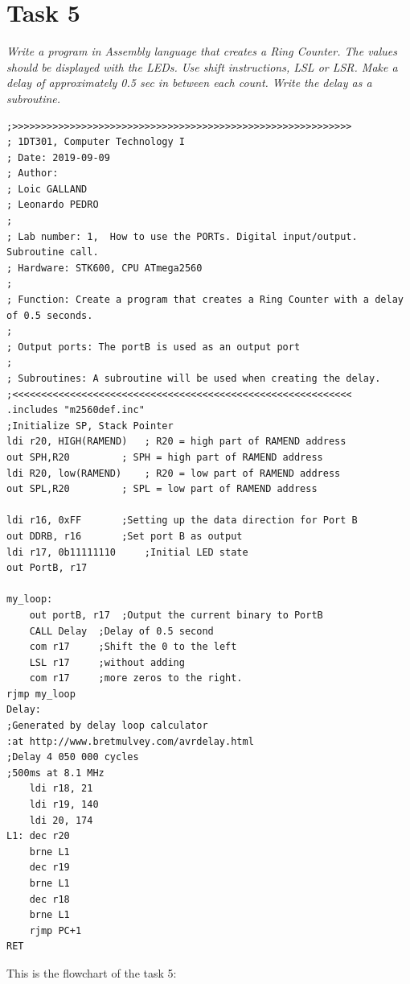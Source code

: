 \documentclass[a4paper,12pt]{article}
\begin{document}
\section{Task 5}
\textit{Write a program in Assembly language that creates a Ring Counter. The values should be
displayed with the LEDs. Use shift instructions, LSL or LSR.
Make a delay of approximately 0.5 sec in between each count. Write the delay as a
subroutine.}
\lstset{style=Asm}
\begin{lstlisting}
;>>>>>>>>>>>>>>>>>>>>>>>>>>>>>>>>>>>>>>>>>>>>>>>>>>>>>>>>>>>
; 1DT301, Computer Technology I
; Date: 2019-09-09
; Author:
; Loic GALLAND
; Leonardo PEDRO
;
; Lab number: 1,  How to use the PORTs. Digital input/output. Subroutine call.
; Hardware: STK600, CPU ATmega2560
;
; Function: Create a program that creates a Ring Counter with a delay of 0.5 seconds. 
;
; Output ports: The portB is used as an output port
;
; Subroutines: A subroutine will be used when creating the delay. 
;<<<<<<<<<<<<<<<<<<<<<<<<<<<<<<<<<<<<<<<<<<<<<<<<<<<<<<<<<<<
.includes "m2560def.inc"
;Initialize SP, Stack Pointer
ldi r20, HIGH(RAMEND)	; R20 = high part of RAMEND address
out SPH,R20 		; SPH = high part of RAMEND address
ldi R20, low(RAMEND) 	; R20 = low part of RAMEND address
out SPL,R20 		; SPL = low part of RAMEND address

ldi r16, 0xFF 		;Setting up the data direction for Port B
out DDRB, r16 		;Set port B as output
ldi r17, 0b11111110 	;Initial LED state
out PortB, r17

my_loop:
	out portB, r17	;Output the current binary to PortB
	CALL Delay	;Delay of 0.5 second
	com r17		;Shift the 0 to the left
	LSL r17		;without adding 
	com r17		;more zeros to the right.
rjmp my_loop
Delay:
;Generated by delay loop calculator
:at http://www.bretmulvey.com/avrdelay.html
;Delay 4 050 000 cycles
;500ms at 8.1 MHz
	ldi r18, 21
	ldi r19, 140
	ldi 20, 174
L1:	dec r20
	brne L1
	dec r19
	brne L1
	dec r18
	brne L1
	rjmp PC+1
RET
\end{lstlisting}
\newpage
This is the flowchart of the task 5:
\end{document}
